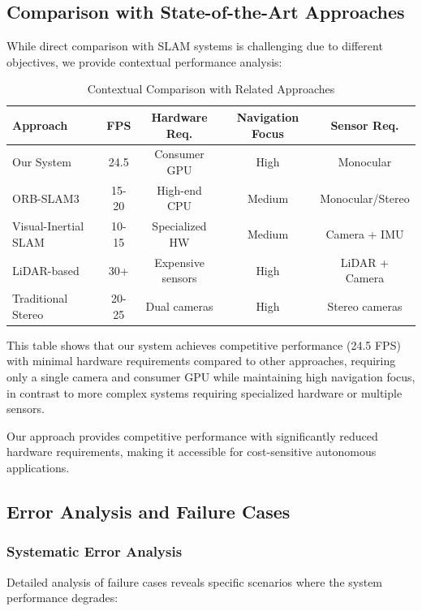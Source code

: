 \documentclass[12pt,oneside]{book}
\begin{document}
\subsection{Comparison with State-of-the-Art Approaches}

While direct comparison with SLAM systems is challenging due to different objectives, we provide contextual performance analysis:

\begin{table}[ht]
\centering
\caption{Contextual Comparison with Related Approaches}
\label{tab:sota_comparison}
\begin{tabular}{@{}lcccc@{}}
\toprule
\textbf{Approach} & \textbf{FPS} & \textbf{Hardware Req.} & \textbf{Navigation Focus} & \textbf{Sensor Req.} \\
\midrule
Our System & 24.5 & Consumer GPU & High & Monocular \\
ORB-SLAM3 & 15-20 & High-end CPU & Medium & Monocular/Stereo \\
Visual-Inertial SLAM & 10-15 & Specialized HW & Medium & Camera + IMU \\
LiDAR-based & 30+ & Expensive sensors & High & LiDAR + Camera \\
Traditional Stereo & 20-25 & Dual cameras & High & Stereo cameras \\
\bottomrule
\end{tabular}
\end{table}

This table shows that our system achieves competitive performance (24.5 FPS) with minimal hardware requirements compared to other approaches, requiring only a single camera and consumer GPU while maintaining high navigation focus, in contrast to more complex systems requiring specialized hardware or multiple sensors.

Our approach provides competitive performance with significantly reduced hardware requirements, making it accessible for cost-sensitive autonomous applications.

\subsection{Error Analysis and Failure Cases}

\subsubsection{Systematic Error Analysis}

Detailed analysis of failure cases reveals specific scenarios where the system performance degrades:
\end{document}
